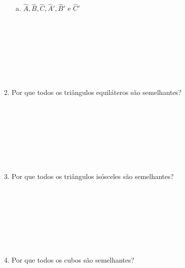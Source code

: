 \documentclass[a4paper,14pt]{article}
\begin{document}
\begin{multicols}{2}
\begin{enumerate}
\begin{enumerate}[a)]
				\item $\hat{A}, \hat{B}, \hat{C}, \hat{A}', \hat{B}'$ e $\hat{C}'$ \\\\\\\\\\\\\\\\
			\end{enumerate}
			\item Por que todos os triângulos equiláteros são semelhantes? \\\\\\\\\\\\\\\\
			\item Por que todos os triângulos isósceles são semelhantes? \\\\\\\\\\\\\\\\
			\item Por que todos os cubos são semelhantes? \\\\\\\\\\\\\\\\
		\end{enumerate}
		$~$ \\ $~$ \\ $~$ \\ $~$ \\ $~$ \\ $~$ \\ $~$ \\ $~$ \\ $~$ \\ $~$
	\end{multicols}
\end{document}
